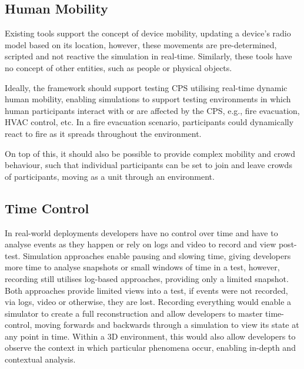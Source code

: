 \subsection{Human Mobility} %
\label{sub:requirements_mobility}
Existing tools support the concept of device mobility, updating a device's radio model based on its location, however, these movements are pre-determined, scripted and not reactive the simulation in real-time. Similarly, these tools have no concept of other entities, such as people or physical objects.

Ideally, the framework should support testing CPS utilising real-time dynamic human mobility, enabling simulations to support testing environments in which human participants interact with or are affected by the CPS, e.g., fire evacuation, HVAC control, etc. In a fire evacuation scenario, participants could dynamically react to fire as it spreads throughout the environment.

On top of this, it should also be possible to provide complex mobility and crowd behaviour, such that individual participants can be set to join and leave crowds of participants, moving as a unit through an environment.




\subsection{Time Control}
\label{sub:requirements_Time Control}
In real-world deployments developers have no control over time and have to analyse events as they happen or rely on logs and video to record and view post-test. Simulation approaches enable pausing and slowing time, giving developers more time to analyse snapshots or small windows of time in a test, however, recording still utilises log-based approaches, providing only a limited snapshot. Both approaches provide limited views into a test, if events were not recorded, via logs, video or otherwise, they are lost.
Recording everything would enable a simulator to create a full reconstruction and allow developers to master time-control, moving forwards and backwards through a simulation to view its state at any point in time. Within a 3D environment, this would also allow developers to observe the context in which particular phenomena occur, enabling in-depth and contextual analysis.

